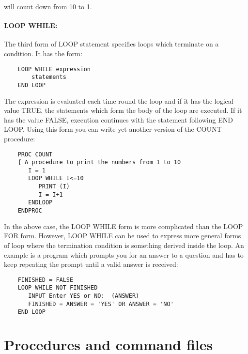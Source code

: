will count down from 10 to 1.

\paragraph{LOOP WHILE:}\hfill

The third form of LOOP statement specifies loops which terminate on a condition.
It has the form:

\begin{small}
\begin{verbatim}
    LOOP WHILE expression
        statements
    END LOOP
\end{verbatim}
\end{small}

The expression is evaluated each time round the loop and if it has the logical
value TRUE, the statements which form the body of the loop are executed.
If it has the value FALSE, execution continues with the statement following
END LOOP.
Using this form you can write yet another version of the COUNT procedure:

\begin{small}
\begin{verbatim}
    PROC COUNT
    { A procedure to print the numbers from 1 to 10
       I = 1
       LOOP WHILE I<=10
          PRINT (I)
          I = I+1
       ENDLOOP
    ENDPROC
\end{verbatim}
\end{small}

In the above case, the LOOP WHILE form is more complicated than the LOOP FOR
form.
However, LOOP WHILE can be used to express more general forms of loop
where the termination condition is something derived inside the loop.
An example is a program which prompts you for an answer to a question
and has to keep repeating the prompt until a valid answer is received:

\begin{small}
\begin{verbatim}
    FINISHED = FALSE
    LOOP WHILE NOT FINISHED
       INPUT Enter YES or NO:  (ANSWER)
       FINISHED = ANSWER = 'YES' OR ANSWER = 'NO'
    END LOOP
\end{verbatim}
\end{small}

\section{Procedures and command files}
\label{S_pcf}

